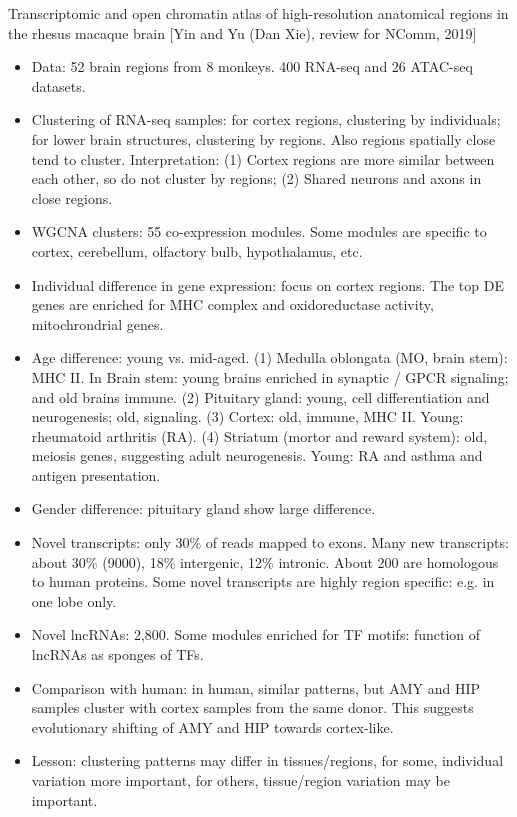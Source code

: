 \documentclass{report}
\begin{document}
Transcriptomic and open chromatin atlas of high-resolution anatomical regions in the rhesus macaque brain [Yin and Yu (Dan Xie), review for NComm, 2019]
\begin{itemize}
	\item Data: 52 brain regions from 8 monkeys. 400 RNA-seq and 26 ATAC-seq datasets.
	
	\item Clustering of RNA-seq samples: for cortex regions, clustering by individuals; for lower brain structures, clustering by regions. Also regions spatially close tend to cluster. Interpretation: (1) Cortex regions are more similar between each other, so do not cluster by regions; (2) Shared neurons and axons in close regions.
	
	\item WGCNA clusters: 55 co-expression modules. Some modules are specific to cortex, cerebellum, olfactory bulb, hypothalamus, etc.
	
	\item Individual difference in gene expression: focus on cortex regions. The top DE genes are enriched for MHC complex and oxidoreductase activity, mitochrondrial genes.
	
	\item Age difference: young vs. mid-aged. (1) Medulla oblongata (MO, brain stem): MHC II. In Brain stem: young brains enriched in synaptic / GPCR signaling; and old brains immune. (2) Pituitary gland: young, cell differentiation and neurogenesis; old, signaling. (3) Cortex: old, immune, MHC II. Young: rheumatoid arthritis (RA). (4) Striatum (mortor and reward system): old, meiosis genes, suggesting adult neurogenesis. Young: RA and asthma and antigen presentation.
	
	\item Gender difference: pituitary gland show large difference.
	
	\item Novel transcripts: only 30\% of reads mapped to exons. Many new transcripts: about 30\% (9000), 18\% intergenic, 12\% intronic. About 200 are homologous to human proteins. Some novel transcripts are highly region specific: e.g. in one lobe only.
	
	\item Novel lncRNAs: 2,800. Some modules enriched for TF motifs: function of lncRNAs as sponges of TFs.
	
	\item Comparison with human: in human, similar patterns, but AMY and HIP samples cluster with cortex samples from the same donor. This suggests evolutionary shifting of AMY and HIP towards cortex-like.
	
	\item Lesson: clustering patterns may differ in tissues/regions, for some, individual variation more important, for others, tissue/region variation may be important.
\end{itemize}
\end{document}
